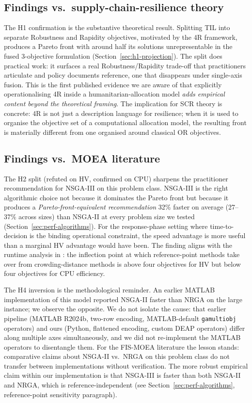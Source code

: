 \documentclass[applsci,article,submit,moreauthors,pdftex]{Definitions/mdpi}
\begin{document}
\subsection{Findings vs.\ supply-chain-resilience theory}\label{sec:disc-scr}

The H1 confirmation is the substantive theoretical result. Splitting TIL
into separate Robustness and Rapidity objectives, motivated by the 4R
framework, produces a Pareto front with around half its solutions
unrepresentable in the fused 3-objective formulation
(Section~\ref{sec:h1-projection}). The split does practical work: it surfaces a
real Robustness/Rapidity trade-off that practitioners articulate and policy
documents reference, one that disappears under single-axis fusion. This is the first published evidence we are aware of
that explicitly operationalising 4R inside a humanitarian-allocation model
\emph{adds empirical content beyond the theoretical framing}. The
implication for SCR theory is concrete: 4R is not just a description
language for resilience; when it is used to organise the objective set of
a computational allocation model, the resulting front is materially
different from one organised around classical OR objectives.

\subsection{Findings vs.\ MOEA literature}\label{sec:disc-moea}

The H2 split (refuted on HV, confirmed on CPU) sharpens the practitioner
recommendation for NSGA-III on this problem class. NSGA-III is the right
algorithmic choice not because it dominates the Pareto front but because
it produces a \emph{Pareto-front-equivalent recommendation} 32\% faster
on average (27--37\% across sizes) than NSGA-II at every problem size we tested
(Section~\ref{sec:perf-algorithms}). For the response-phase setting where
time-to-decision is the binding operational constraint, the speed
advantage is more useful than a marginal HV advantage would have been.
The finding aligns with the runtime analysis in \cite{zheng2024nsga2}: the
inflection point at which reference-point methods take over from
crowding-distance methods is above four objectives for HV but below four
objectives for CPU efficiency.

The H4 inversion is the methodological reminder. An earlier MATLAB
implementation of this model reported NSGA-II faster than NRGA on the large
instance; we observe the opposite. We do not isolate the cause: that earlier
pipeline (MATLAB R2024b, two-row encoding, MATLAB-default
\texttt{gamultiobj} operators) and ours (Python, flattened
encoding, custom DEAP operators) differ along multiple axes
simultaneously, and we did not re-implement the MATLAB operators to
disentangle them. For the FIS-MOEA literature the lesson stands:
comparative claims about NSGA-II vs.\ NRGA on this problem class do not
transfer between implementations without verification. The more robust
empirical claim within our implementation is that NSGA-III is faster
than both NSGA-II and NRGA, which is reference-independent (see
Section~\ref{sec:perf-algorithms}, reference-point sensitivity
paragraph).
\end{document}
